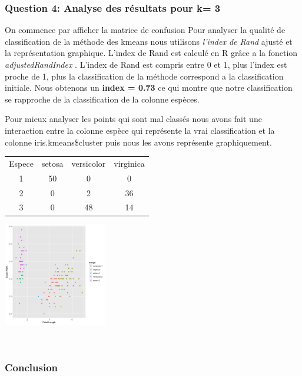 \documentclass[10pt]{article}
\begin{document}
 \subsubsection{ Question 4: Analyse des résultats pour k= 3}
On commence par afficher la matrice de confusion
Pour analyser la qualité de classification de la méthode des kmeans nous utilisons\textit{ l'index de Rand} ajusté et la représentation graphique. L'index de Rand est calculé en R grâce a la fonction \textit{adjustedRandIndex} . L'index de Rand est compris entre 0 et 1, plus l'index est proche de 1, plus la classification de la méthode correspond a la classification initiale. Nous obtenons un \textbf{index = 0.73 } ce qui montre que notre classification se rapproche de la classification de la colonne espèces.

Pour mieux analyser les points qui sont mal classés nous avons fait une interaction entre la colonne espèce qui représente la vrai classification et la colonne iris.kmeans\$cluster puis nous les avons représente graphiquement. 

	\begin{minipage}{.5\textwidth}
		\begin{tabular}{c c c c}	
			Espece &setosa & versicolor & virginica\\
			1     &  50     &     0    &     0\\
			2     & 0       &   2      &  36\\
			3     & 0    &     48   &     14
		\end{tabular}
\end{minipage}%
\hspace{0.08\linewidth}
\begin{minipage}{.5\textwidth}
	\includegraphics[width=45mm]{Figures/Iris_2/interaction.png}
	\label{fig:interaction}
\end{minipage}
\vspace{0.1mm}\\


\subsubsection{Conclusion}
\end{document}
